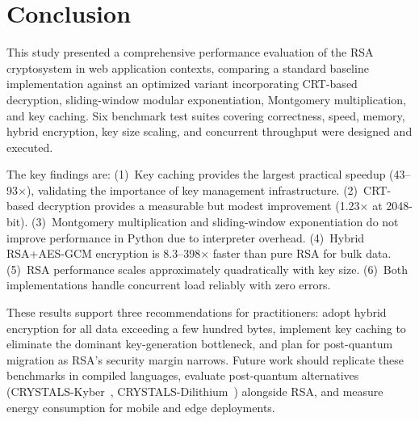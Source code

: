 \documentclass[conference]{IEEEtran}
\begin{document}
\section{Conclusion}
\label{sec:conclusion}

This study presented a comprehensive performance evaluation of the RSA cryptosystem in web application contexts, comparing a standard baseline implementation against an optimized variant incorporating CRT-based decryption, sliding-window modular exponentiation, Montgomery multiplication, and key caching. Six benchmark test suites covering correctness, speed, memory, hybrid encryption, key size scaling, and concurrent throughput were designed and executed.

The key findings are: (1)~Key caching provides the largest practical speedup (43--93$\times$), validating the importance of key management infrastructure. (2)~CRT-based decryption provides a measurable but modest improvement (1.23$\times$ at 2048-bit). (3)~Montgomery multiplication and sliding-window exponentiation do not improve performance in Python due to interpreter overhead. (4)~Hybrid RSA+AES-GCM encryption is 8.3--398$\times$ faster than pure RSA for bulk data. (5)~RSA performance scales approximately quadratically with key size. (6)~Both implementations handle concurrent load reliably with zero errors.

These results support three recommendations for practitioners: adopt hybrid encryption for all data exceeding a few hundred bytes, implement key caching to eliminate the dominant key-generation bottleneck, and plan for post-quantum migration as RSA's security margin narrows. Future work should replicate these benchmarks in compiled languages, evaluate post-quantum alternatives (CRYSTALS-Kyber~\cite{kyber2023}, CRYSTALS-Dilithium~\cite{dilithium2022}) alongside RSA, and measure energy consumption for mobile and edge deployments.
\end{document}

